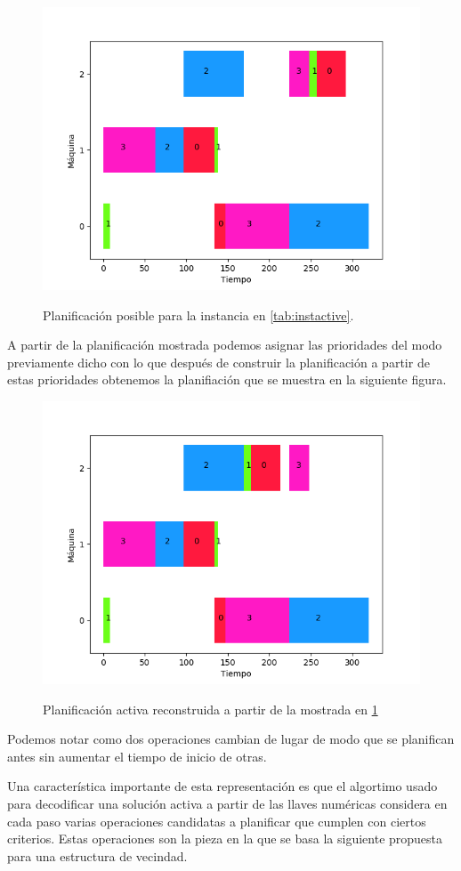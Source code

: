 \begin{figure}[H]
     \centering
     \includegraphics[scale=.7]{Imagenes/ganttnonactivepr.png}
     \label{fig:nonactivepr}
     \caption{Planificación posible para la instancia en \ref{tab:instactive}. }
\end{figure}
A partir de la planificación mostrada podemos asignar las prioridades del modo previamente dicho con lo que después de construir la planificación a partir de estas prioridades obtenemos la planifiación que se muestra en la siguiente figura.
\begin{figure}[H]
     \centering
     \includegraphics[scale=.7]{Imagenes/ganttactivepr.png}
     \label{fig:activepr}
     \caption{Planificación activa reconstruida a partir de la mostrada en \ref{fig:nonactivepr}}
\end{figure}

Podemos notar como dos operaciones cambian de lugar de modo que se planifican antes sin aumentar el tiempo de inicio de otras.

Una característica importante de esta representación es que el algortimo usado para decodificar una solución activa a partir de las llaves numéricas considera en cada paso varias operaciones candidatas a planificar que cumplen con ciertos criterios. Estas operaciones son la pieza en la que se basa la siguiente propuesta para una estructura de vecindad.

